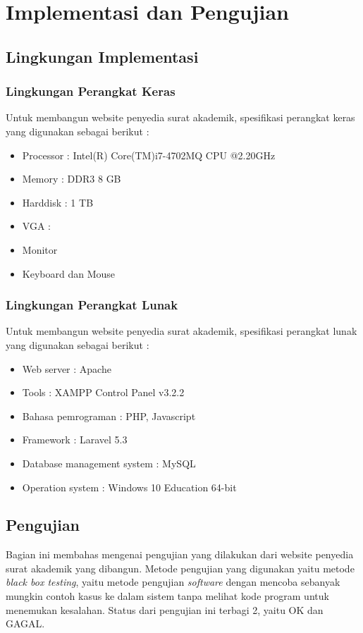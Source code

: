 \chapter{Implementasi dan Pengujian}
\label{chap:implementasi_dan_pengujian}

\section{Lingkungan Implementasi}
\label{sec:lingkungan_implementasi}

\subsection{Lingkungan Perangkat Keras}
\label{sec:lingkungan_perangkat_keras}
Untuk membangun website penyedia surat akademik, spesifikasi perangkat keras yang digunakan sebagai berikut :
\begin{itemize}
	\item Processor : Intel(R) Core(TM)i7-4702MQ CPU @2.20GHz
	\item Memory : DDR3 8 GB
	\item Harddisk : 1 TB
	\item VGA :
	\item Monitor
	\item Keyboard dan Mouse
\end{itemize}

\subsection{Lingkungan Perangkat Lunak}
\label{sec:lingkungan_perangkat_lunak}
Untuk membangun website penyedia surat akademik, spesifikasi perangkat lunak yang digunakan sebagai berikut :
\begin{itemize}
	\item Web server : Apache
	\item Tools : XAMPP Control Panel v3.2.2
	\item Bahasa pemrograman : PHP, Javascript
	\item Framework : Laravel 5.3
	\item Database management system : MySQL 
	\item Operation system : Windows 10 Education 64-bit
\end{itemize}

\section{Pengujian}
\label{sec:pengujian}
Bagian ini membahas mengenai pengujian yang dilakukan dari website penyedia surat akademik yang dibangun. Metode pengujian yang digunakan yaitu metode \textit{black box testing}, yaitu metode pengujian \textit{software} dengan mencoba sebanyak mungkin contoh kasus ke dalam sistem tanpa melihat kode program untuk menemukan kesalahan. Status dari pengujian ini terbagi 2, yaitu OK dan GAGAL.


